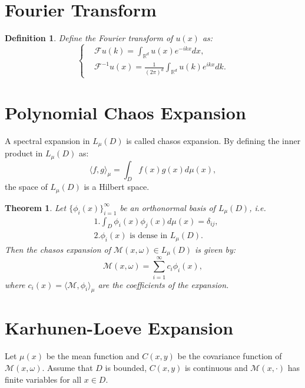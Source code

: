 \documentclass{article}
\newtheorem{theorem}{Theorem}
\newtheorem{definition}{Definition}
\begin{document}
\section{Fourier Transform}\label{FourierTransform}
\begin{definition}
	Define the Fourier transform of $u(x)$ as:
	\begin{equation}\left\{
		\begin{aligned}
			& \mathcal{F}u(k) = \int_{\mathbb{R}^d} u(x) e^{-ikx} dx,\\
			& \mathcal{F}^{-1}u(x) = \frac{1}{(2\pi)^{d}}\int_{\mathbb{R}^d} u(k) e^{ikx} dk.
		\end{aligned}\right.
	\end{equation}
\end{definition}
\section{Polynomial Chaos Expansion}\label{PCE}
A spectral expansion in $L_{\mu}(D)$ is called chasos expansion. By defining the inner product in $L_{\mu}(D)$ as:
\begin{equation}
	\langle f, g \rangle_{\mu} = \int_D f(x) g(x) d\mu(x),
\end{equation}
the space of $L_\mu(D)$ is a Hilbert space.
\begin{theorem}
	Let $\{\phi_i(x)\}_{i=1}^{\infty}$ be an orthonormal basis of $L_\mu(D)$, i.e.
	\begin{equation}
		\begin{aligned}
			&1. \int_D \phi_i(x) \phi_j(x) d\mu(x) = \delta_{ij},\\
			&2. {\phi_i(x)} \text{ is dense in } L_\mu(D).
		\end{aligned}
	\end{equation}
	Then the chasos expansion of $\mathcal{M}(x, \omega)\in L_\mu(D)$ is given by:
	\begin{equation}
		\mathcal{M}(x, \omega) = \sum_{i=1}^{\infty} c_i \phi_i(x),
	\end{equation}
	where $c_i(x)=\langle \mathcal{M}, \phi_i\rangle_{\mu}$ are the coefficients of the expansion.
\end{theorem}
	

\section{Karhunen-Loeve Expansion}\label{KLE}
Let $\mu(x)$ be the mean function and $C(x, y)$ be the covariance function of $\mathcal{M}(x, \omega)$. 
Assume that $D$ is bounded, $C(x, y)$ is continuous and $\mathcal{M}(x, \cdot)$ has finite variables for all $x\in D$.
\end{document}
